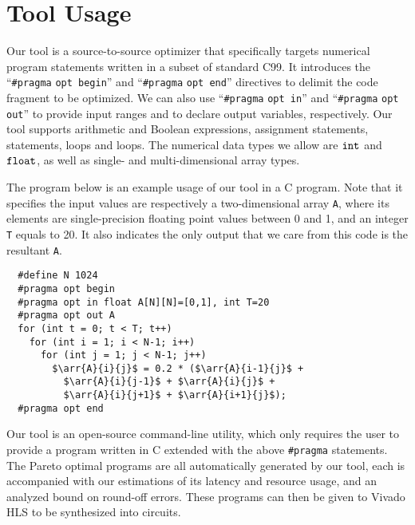 \section{Tool Usage}
\label{sec:usage}

Our tool is a source-to-source optimizer that specifically targets numerical
program statements written in a subset of standard C99. It introduces the
``\verb|#pragma| \verb|opt begin|'' and ``\verb|#pragma| \verb|opt end|''
directives to delimit the code fragment to be optimized. We can also use
``\verb|#pragma| \verb|opt in|'' and ``\verb|#pragma| \verb|opt out|'' to
provide input ranges and to declare output variables, respectively. Our tool
supports arithmetic and Boolean expressions, assignment statements, \iflit{}
statements, \whilelit{} loops and \forlit{} loops.  The numerical data types we
allow are $\texttt{int}$ and $\texttt{float}$, as well as single- and multi-dimensional
array types.

The program below is an example usage of our tool in a C program.  Note
that it specifies the input values are respectively a two-dimensional array
\verb|A|, where its elements are single-precision floating point values between
0 and 1, and an integer \verb|T| equals to 20.  It also indicates the only
output that we care from this code is the resultant \verb|A|.
\begin{lstlisting}
  #define N 1024
  #pragma opt begin
  #pragma opt in float A[N][N]=[0,1], int T=20
  #pragma opt out A
  for (int t = 0; t < T; t++)
    for (int i = 1; i < N-1; i++)
      for (int j = 1; j < N-1; j++)
        $\arr{A}{i}{j}$ = 0.2 * ($\arr{A}{i-1}{j}$ +
          $\arr{A}{i}{j-1}$ + $\arr{A}{i}{j}$ +
          $\arr{A}{i}{j+1}$ + $\arr{A}{i+1}{j}$);
  #pragma opt end
\end{lstlisting}

Our tool is an open-source command-line utility, which only requires the user
to provide a program written in C extended with the above \verb|#pragma|
statements.  The Pareto optimal programs are all automatically generated by
our tool, each is accompanied with our estimations of its latency and resource
usage, and an analyzed bound on round-off errors.  These programs can then be
given to Vivado HLS to be synthesized into circuits.
